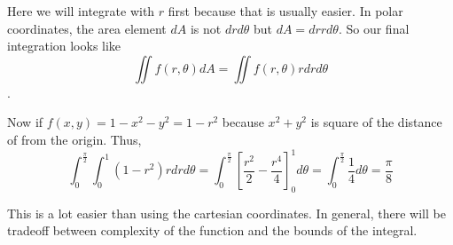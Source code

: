 Here we will integrate with $r$ first because that is usually easier.
In polar coordinates, the area element $dA$ is not $dr d\theta$ but  $dA = dr r d\theta$.
So our final integration looks like $$ \iint f(r, \theta) dA = \iint f(r, \theta) r dr d\theta$$.

Now if $f(x, y) = 1 - x^2 - y^2 = 1 - r^2$ because $x^2 + y^2$ is square of the distance of from the origin.
Thus, 
$$
\int_0^{\frac{\pi}{2}} \int_0^1 (1-r^2) r dr d\theta
 = \int_0^{\frac{\pi}{2}} \left[ \frac{r^2}{2} - \frac{r^4}{4} \right]_0^1 d\theta
 = \int_0^{\frac{\pi}{2}} \frac{1}{4} d\theta = \frac{\pi}{8}
$$

This is a lot easier than using the cartesian coordinates.
In general, there will be tradeoff between complexity of the function and the bounds of the integral.

